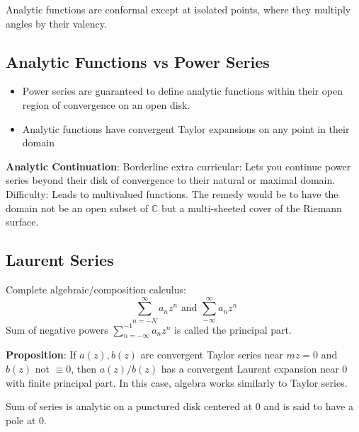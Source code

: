 \documentclass{report}
\begin{document}
\begin{theorem}{}
    Analytic functions are conformal except at isolated points, where they multiply angles by their valency.
\end{theorem}

\begin{topic}
    \section{Analytic Functions vs Power Series}
\end{topic}

\begin{itemize}
    \item Power series are guaranteed to define analytic functions within their open region of convergence on an open disk.

    \item Analytic functions have convergent Taylor expansions on any point in their domain 
\end{itemize}

\textbf{Analytic Continuation}: Borderline extra curricular: Lets you continue power series beyond their disk of convergence to their natural or maximal domain. Difficulty: Leads to multivalued functions. The remedy would be to have the domain not be an open subset of $\mathbb{C}$ but a multi-sheeted cover of the Riemann surface.

\begin{topic}
    \section{Laurent Series}
\end{topic} 

Complete algebraic/composition calculus:
    \begin{equation*}
        \sum_{n = -N}^{\infty} a_{n}z^{n} \text{ and } \sum_{ -\infty}^{\infty}a_{n}z^{n}
    \end{equation*}
Sum of negative powers $\sum_{n = -\infty}^{-1}a_{n}z^{n}$ is called the principal part.

\textbf{Proposition}: If $a(z), b(z)$ are convergent Taylor series near $mz = 0$ and $b(z)$  not $\equiv 0$, then $a(z)/b(z)$ has a convergent Laurent expansion near $0$ with finite principal part. In this case, algebra works similarly to Taylor series.

Sum of series is analytic on a punctured disk centered at $0$ and is said to have a pole at $0$.
\end{document}
